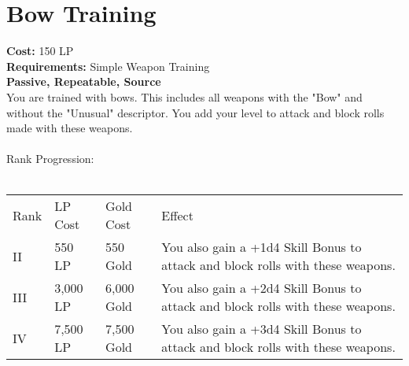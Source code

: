 \section{Bow Training}\label{perk:bowTraining}
\textbf{Cost:} 150 LP\\
\textbf{Requirements:} Simple Weapon Training\\
\textbf{Passive, Repeatable, Source}\\
You are trained with bows.
This includes all weapons with the "Bow" and without the "Unusual" descriptor.
You add your level to attack and block rolls made with these weapons.\\
\\
Rank Progression:\\
\\
\begin{longtable}{l | l | l | p{9cm}}
	Rank & LP Cost & Gold Cost & Effect\\
	II & 550 LP & 550 Gold & You also gain a +1d4 Skill Bonus to attack and block rolls with these weapons.\\
	III & 3,000 LP & 6,000 Gold & You also gain a +2d4 Skill Bonus to attack and block rolls with these weapons.\\
	IV & 7,500 LP & 7,500 Gold & You also gain a +3d4 Skill Bonus to attack and block rolls with these weapons.\\
\end{longtable}